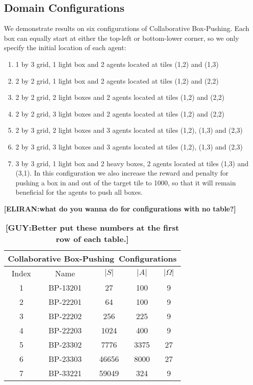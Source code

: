 \documentclass[letterpaper]{article} %
\theoremstyle{definition}
\newcommand{\eliran}[1]{\textbf{[\color{red}ELIRAN:#1]}}
\newcommand{\guy}[1]{\textbf{[\color{orange}GUY:#1]}}
\newcommand{\cbp}[0]{Collaborative Box-Pushing}
\begin{document}
\subsection{Domain Configurations}
We demonstrate results on six configurations of \cbp. Each box can equally start at either the top-left or bottom-lower corner, so we only specify the initial location of each agent:
\begin{enumerate}
    \item 1 by 3 grid, 1 light box and 2 agents located at tiles (1,2) and (1,3)
    \item 2 by 2 grid, 1 light box and 2 agents located at tiles (1,2) and (2,2)
    \item 2 by 2 grid, 2 light boxes and 2 agents located at tiles (1,2) and (2,2)
    \item 2 by 2 grid, 3 light boxes and 2 agents located at tiles (1,2) and (2,2)
    \item 2 by 3 grid, 2 light boxes and 3 agents located at tiles (1,2), (1,3) and (2,3)
    \item 2 by 3 grid, 3 light boxes and 3 agents located at tiles (1,2), (1,3) and (2,3)
    \item 3 by 3 grid, 1 light box and 2 heavy boxes, 2 agents located at tiles (1,3) and (3,1). In this configuration we also increase the reward and penalty for pushing a box in and out of the target tile to 1000, so that it will remain beneficial for the agents to push all boxes.
\end{enumerate}

\begin{table}
\caption{\guy{Better put these numbers at the first row of each table.}}\eliran{what do you wanna do for configurations with no table?}
\begin{center}
    \begin{tabular}{||c|c|c|c|c||}
         \hline
         \multicolumn{5}{||c||}{\cbp \ Configurations} \\
         \hline
         Index & Name & $|S|$ & $|A|$ & $|\Omega| $ \\ 
         \hline
         1 & BP-13201 & 27 & 100 & 9 \\
         \hline
         2 & BP-22201 & 64 & 100 & 9 \\
         \hline
         3 & BP-22202 & 256 & 225 & 9 \\
         \hline
         4 & BP-22203 & 1024 & 400 & 9 \\
         \hline
         5 & BP-23302 & 7776 & 3375 & 27 \\ 
         \hline
         6 & BP-23303 & 46656 & 8000 & 27 \\
         \hline
         7 & BP-33221 & 59049 & 324 & 9 \\
         \hline
    \end{tabular}
\end{center}
\end{table}
\end{document}
